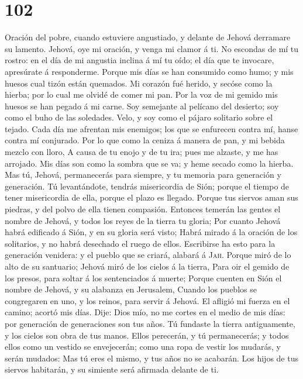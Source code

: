 \hypertarget{section-101}{%
\section{102}\label{section-101}}

 Oración del pobre, cuando estuviere angustiado, y delante
de Jehová derramare su lamento. Jehová, oye mi oración, y venga mi
clamor á ti.  No escondas de mí tu rostro: en el día de mi
angustia inclina á mí tu oído; el día que te invocare, apresúrate á
responderme.  Porque mis días se han consumido como humo;
y mis huesos cual tizón están quemados.  Mi corazón fué
herido, y secóse como la hierba; por lo cual me olvidé de comer mi pan.
 Por la voz de mi gemido mis huesos se han pegado á mi
carne.  Soy semejante al pelícano del desierto; soy como
el buho de las soledades.  Velo, y soy como el pájaro
solitario sobre el tejado.  Cada día me afrentan mis
enemigos; los que se enfurecen contra mí, hanse contra mí conjurado.
 Por lo que como la ceniza á manera de pan, y mi bebida
mezclo con lloro,  A causa de tu enojo y de tu ira; pues
me alzaste, y me has arrojado.  Mis días son como la
sombra que se va; y heme secado como la hierba.  Mas tú,
Jehová, permanecerás para siempre, y tu memoria para generación y
generación.  Tú levantándote, tendrás misericordia de
Sión; porque el tiempo de tener misericordia de ella, porque el plazo es
llegado.  Porque tus siervos aman sus piedras, y del
polvo de ella tienen compasión.  Entonces temerán las
gentes el nombre de Jehová, y todos los reyes de la tierra tu gloria;
 Por cuanto Jehová habrá edificado á Sión, y en su gloria
será visto;  Habrá mirado á la oración de los solitarios,
y no habrá desechado el ruego de ellos.  Escribirse ha
esto para la generación venidera: y el pueblo que se criará, alabará á
\textsc{Jah}.  Porque miró de lo alto de su santuario;
Jehová miró de los cielos á la tierra,  Para oir el
gemido de los presos, para soltar á los sentenciados á muerte;
 Porque cuenten en Sión el nombre de Jehová, y su
alabanza en Jerusalem,  Cuando los pueblos se congregaren
en uno, y los reinos, para servir á Jehová.  El afligió
mi fuerza en el camino; acortó mis días.  Dije: Dios mío,
no me cortes en el medio de mis días: por generación de generaciones son
tus años.  Tú fundaste la tierra antiguamente, y los
cielos son obra de tus manos.  Ellos perecerán, y tú
permanecerás; y todos ellos como un vestido se envejecerán; como una
ropa de vestir los mudarás, y serán mudados:  Mas tú eres
el mismo, y tus años no se acabarán.  Los hijos de tus
siervos habitarán, y su simiente será afirmada delante de ti.

